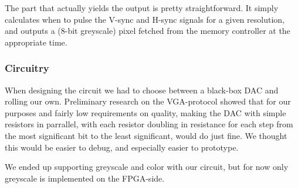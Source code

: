  
The part that actually yields the output is pretty straightforward. It simply
calculates when to pulse the V-sync and H-sync signals for a given resolution,
and outputs a (8-bit greyscale) pixel fetched from the memory controller at the
appropriate time.

\subsubsection{Circuitry}
When designing the circuit we had to choose between a black-box DAC and rolling our own. Preliminary research on the
VGA-protocol showed that for our purposes and fairly low requirements on
quality, making the DAC with simple resistors in parrallel, with each resistor
doubling in resistance for each step from the most significant bit to the least
significant, would do just fine. We thought this would be easier to debug, and
especially easier to prototype.

We ended up supporting greyscale and color with our circuit, but for now only
greyscale is implemented on the FPGA-side.
